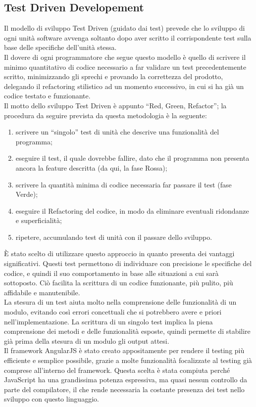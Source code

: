 \subsection{Test Driven Developement}
Il modello di sviluppo Test Driven (guidato dai test) prevede che lo sviluppo di ogni unità software avvenga soltanto dopo aver scritto il corrispondente test sulla base delle specifiche dell’unità stessa.\\
Il dovere di ogni programmatore che segue questo modello è quello di scrivere il minimo quantitativo di codice necessario a far validare un test precedentemente scritto, minimizzando gli sprechi e provando la correttezza del prodotto, delegando il refactoring stilistico ad un momento successivo, in cui si ha già un codice testato e funzionante.\\
Il motto dello sviluppo Test Driven è appunto “Red, Green, Refactor”; la procedura da seguire prevista da questa metodologia è la seguente:
\begin{enumerate}
	\item scrivere un “singolo” test di unità che descrive una funzionalità del programma;
	\item eseguire il test, il quale dovrebbe fallire, dato che il programma non presenta ancora la feature descritta (da qui, la fase Rossa);
	\item scrivere la quantità minima di codice necessaria far passare il test (fase Verde);
	\item eseguire il Refactoring del codice, in modo da eliminare eventuali ridondanze e superficialità;
	\item ripetere, accumulando test di unità con il passare dello sviluppo.
\end{enumerate}
 \`{E} stato scelto di utilizzare questo approccio in quanto presenta dei vantaggi significativi. Questi test permettono di individuare con precisione le specifiche del codice, e quindi il suo comportamento in base alle situazioni a cui sarà sottoposto. Ciò facilita la scrittura di un codice funzionante, più pulito, più affidabile e manutenibile.\\
La stesura di un test aiuta molto nella comprensione delle funzionalità di un modulo, evitando così errori concettuali che si potrebbero avere e priori nell'implementazione. La scrittura di un singolo test implica la piena comprensione dei metodi e delle funzionalità esposte, quindi permette di stabilire già prima della stesura di un modulo gli output attesi.\\
Il framework AngularJS è stato creato appositamente per rendere il testing più efficiente e semplice possibile, grazie a molte funzionalità focalizzate al testing già comprese all’interno del framework. Questa scelta è stata compiuta perché JavaScript ha una grandissima potenza espressiva, ma quasi nessun controllo da parte del compilatore, il che rende necessaria la costante presenza dei test nello sviluppo con questo linguaggio.

